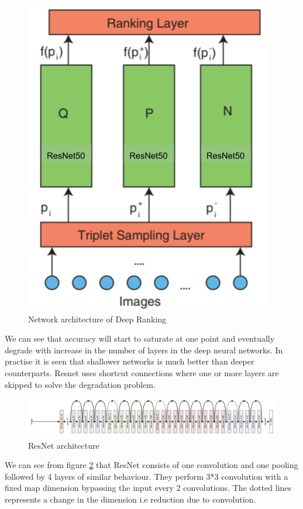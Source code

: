 \begin{figure}[tp!]
\centerline{\includegraphics[scale=0.5]{imgs/architecture.png}}
    \caption{Network architecture of Deep Ranking}
    \label{fig:architecture}
\end{figure}






We can see that accuracy will start to saturate at one point and eventually degrade with increase in the number of layers in the deep neural networks. In practise it is seen that shallower networks is much better than deeper counterparts. Resnet uses shortcut connections where one or more layers are skipped to solve the degradation problem. 

\begin{figure}[tp!]
\centerline{\includegraphics[width=\columnwidth]{imgs/resnet.png}}
    \caption{ResNet architecture}
    \label{fig:resnet}
\end{figure}

We can see from figure \ref{fig:resnet} that ResNet consists of one convolution and one pooling followed by 4 layers of similar behaviour. They perform 3*3 convolution with a fixed map dimension bypassing the input every 2 convolutions. The dotted lines represents a change in the dimension i.e reduction due to convolution. \newline

